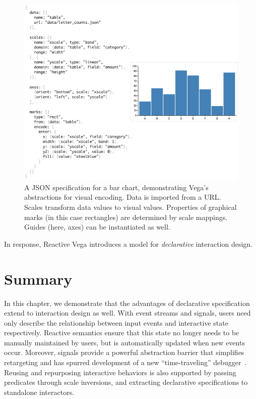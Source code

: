 \begin{figure}[h!]
  \centering
  \includegraphics[width=\columnwidth]{barChart}
  \caption{A JSON specification for a bar chart, demonstrating Vega's
  abstractions for visual encoding. Data is imported from a URL. Scales
  transform data values to visual values. Properties of graphical marks (in
  this case rectangles) are determined by scale mappings. Guides (here, axes)
  can be instantiated as well.}
  \label{fig:vg:barChart}
\end{figure}

In response, Reactive Vega introduces a model for \emph{declarative} interaction
design.





\section{Summary}
\label{sec:vg:lang-summary}

In this chapter, we demonstrate that the advantages of declarative specification
extend to interaction design as well. With event streams and signals, users need
only describe the relationship between input events and interactive state
respectively. Reactive semantics ensure that this state no longer needs to be
manually maintained by users, but is automatically updated when new events
occur. Moreover, signals provide a powerful abstraction barrier that simplifies
retargeting and has spurred development of a new ``time-traveling''
debugger~\cite{hoffswell:debugging}. Reusing and repurposing interactive
behaviors is also supported by passing predicates through scale inversions, and
extracting declarative specifications to standalone interactors.
